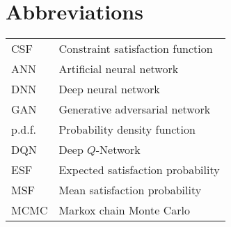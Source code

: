 \documentclass[../main.tex]{subfiles}
\begin{document}
\section*{Abbreviations}

\begin{longtable}[l]{ l l }
    CSF & Constraint satisfaction function \\
    ANN & Artificial neural network \\
    DNN & Deep neural network \\
    GAN & Generative adversarial network \\
    p.d.f. & Probability density function \\
    DQN & Deep $Q$-Network \\
    ESF & Expected satisfaction probability \\
    MSF & Mean satisfaction probability \\
    MCMC & Markox chain Monte Carlo \\
\end{longtable}
\end{document}
